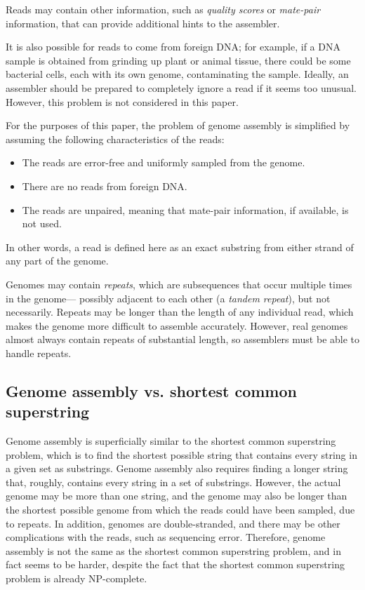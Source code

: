 \documentclass[10pt]{article}
\newcommand{\KeyTerm}[1]{{\it #1}}
\begin{document}
Reads may contain other information, such as \KeyTerm{quality scores} or
\KeyTerm{mate-pair} information, that can provide additional hints to the
assembler.

It is also possible for reads to come from foreign DNA; for example, if a DNA
sample is obtained from grinding up plant or animal tissue, there could be some
bacterial cells, each with its own genome, contaminating the sample.  Ideally,
an assembler should be prepared to completely ignore a read if it seems too
unusual.  However, this problem is not considered in this paper.

For the purposes of this paper, the problem of genome assembly is simplified by
assuming the following characteristics of the reads:

\begin{itemize}
	\item The reads are error-free and uniformly sampled from the genome.
	\item There are no reads from foreign DNA.
	\item The reads are unpaired, meaning that mate-pair information, if
available, is not used.
\end{itemize}

In other words, a read is defined here as an exact substring from either strand
of any part of the genome.

Genomes may contain \KeyTerm{repeats}, which are subsequences that occur
multiple times in the genome--- possibly adjacent to each other (a
\KeyTerm{tandem repeat}), but not necessarily.  Repeats may be longer than the
length of any individual read, which makes the genome more difficult to assemble
accurately.  However, real genomes almost always contain repeats of substantial
length, so assemblers must be able to handle repeats.

\subsection{Genome assembly vs. shortest common superstring}

Genome assembly is superficially similar to the shortest common superstring
problem, which is to find the shortest possible string that contains every
string in a given set as substrings.  Genome assembly also requires finding a
longer string that, roughly, contains every string in  a set of substrings.
However, the actual genome may be more than one string, and the genome may also
be longer than the shortest possible genome from which the reads could have been
sampled, due to repeats.  In addition,  genomes are double-stranded, and there
may be other complications with the reads, such as sequencing error.  Therefore,
genome assembly is not the same as the shortest common superstring problem, and
in fact seems to be harder, despite the fact that the shortest common
superstring problem is already NP-complete\cite{Turner1989}.
\end{document}
